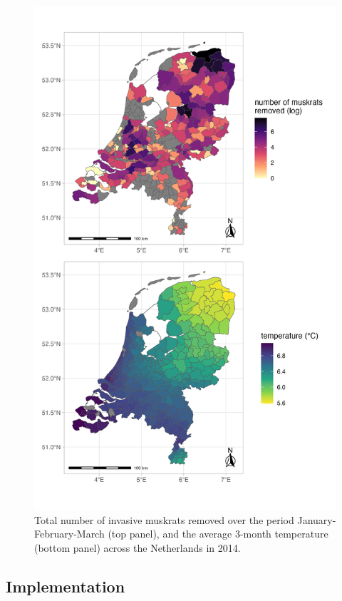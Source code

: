\documentclass[
  11pt,
  a4paper,
]{article}
\begin{document}
\begin{figure}[H]

{\centering \includegraphics[width=0.7\linewidth]{dat_muskrats} 

}

\caption{Total number of invasive muskrats removed over the period January-February-March (top panel), and the average 3-month temperature (bottom panel) across the Netherlands in 2014.}\label{fig:datsmuskrats}
\end{figure}

\subsection{Implementation}\label{implementation}
\end{document}
